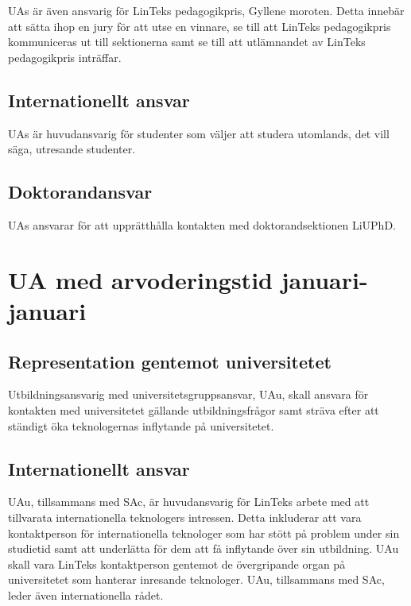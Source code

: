 UAs är även ansvarig för LinTeks pedagogikpris, Gyllene moroten. Detta
innebär att sätta ihop en jury för att utse en vinnare, se till att
LinTeks pedagogikpris kommuniceras ut till sektionerna samt se till att
utlämnandet av LinTeks pedagogikpris inträffar.

\hypertarget{internationellt-ansvar-1}{%
\subsection{Internationellt ansvar}\label{internationellt-ansvar-1}}

UAs är huvudansvarig för studenter som väljer att studera utomlands, det
vill säga, utresande studenter.

\hypertarget{doktorandansvar}{%
\subsection{Doktorandansvar}\label{doktorandansvar}}

UAs ansvarar för att upprätthålla kontakten med doktorandsektionen
LiUPhD.

\hypertarget{ua-med-arvoderingstid-januari-januari}{%
\section{UA med arvoderingstid
januari-januari}\label{ua-med-arvoderingstid-januari-januari}}

\hypertarget{representation-gentemot-universitetet}{%
\subsection{Representation gentemot
universitetet}\label{representation-gentemot-universitetet}}

Utbildningsansvarig med universitetsgruppsansvar, UAu, skall ansvara för
kontakten med universitetet gällande utbildningsfrågor samt sträva efter
att ständigt öka teknologernas inflytande på universitetet.

\hypertarget{internationellt-ansvar-2}{%
\subsection{Internationellt ansvar}\label{internationellt-ansvar-2}}

UAu, tillsammans med SAc, är huvudansvarig för LinTeks arbete med att
tillvarata internationella teknologers intressen. Detta inkluderar att
vara kontaktperson för internationella teknologer som har stött på
problem under sin studietid samt att underlätta för dem att få
inflytande över sin utbildning. UAu skall vara LinTeks kontaktperson
gentemot de övergripande organ på universitetet som hanterar inresande
teknologer. UAu, tillsammans med SAc, leder även internationella rådet.

